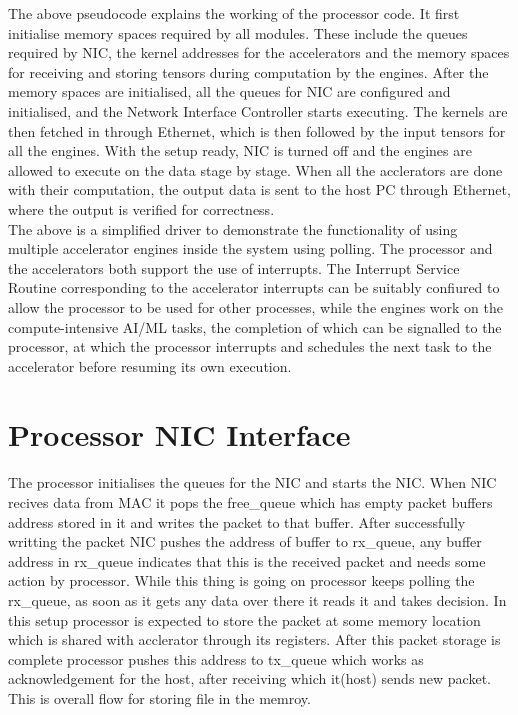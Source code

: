 \documentclass[a4paper,12pt, final]{report}
\begin{document}
The above pseudocode explains the working of the processor code. It first initialise memory spaces required by all modules. These include the queues required by NIC, the kernel addresses for the accelerators and the memory spaces for receiving and storing tensors during computation by the engines. After the memory spaces are initialised, all the queues for NIC are configured and initialised, and the Network Interface Controller starts executing. The kernels are then fetched in through Ethernet, which is then followed by the input tensors for all the engines. With the setup ready, NIC is turned off and the engines are allowed to execute on the data stage by stage. When all the acclerators are done with their computation, the output data is sent to the host PC through Ethernet, where the output is verified for correctness.
\\

The above is a simplified driver to demonstrate the functionality of using multiple accelerator engines inside the system using polling. The processor and the  accelerators both support the use of interrupts. The Interrupt Service Routine corresponding to the accelerator interrupts can be suitably confiured to allow the processor to be used for other processes, while the engines work on the compute-intensive AI/ML tasks, the completion of which can be signalled to the processor, at which the processor interrupts and schedules the next task to the accelerator before resuming its own execution.
\\


\section{Processor NIC Interface}

The processor initialises the queues for the NIC and starts the NIC. When NIC recives data from MAC it pops the free\_queue which has empty packet buffers address stored in it and writes the packet to that buffer. After successfully writting the packet NIC pushes the address of buffer to rx\_queue, any buffer address in rx\_queue indicates that this is the received packet and needs some action by processor. While this thing is going on processor keeps polling the rx\_queue, as soon as it gets any data over there it reads it and takes decision. In this setup processor is expected to store the packet at some memory location which is shared with acclerator through its registers. After this packet storage is complete processor pushes this address to tx\_queue which works as acknowledgement for the host, after receiving which it(host) sends new packet. This is overall flow for storing file in the memroy.
\\
\end{document}
